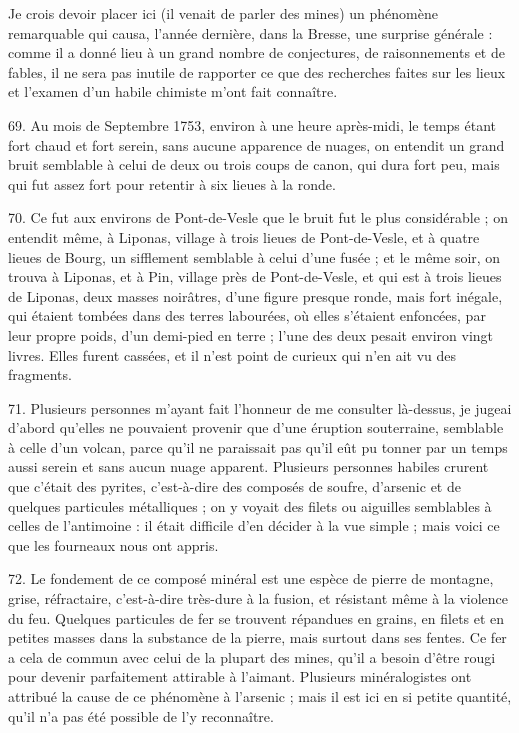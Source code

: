 \documentclass[a4paper, 11pt, oneside, polutonikogreek, french]{article}
\begin{document}
\og Je crois devoir placer ici (il venait de parler des mines) un phénomène remarquable qui causa, l'année dernière, dans la Bresse, une surprise générale : comme il a donné lieu à un grand nombre de conjectures, de raisonnements et de fables, il ne sera pas inutile de rapporter ce que des recherches faites sur les lieux et l'examen d'un habile chimiste m'ont fait connaître. \fg

69. Au mois de Septembre 1753, environ à une heure après-midi, le temps étant fort chaud et fort serein, sans aucune apparence de nuages, on entendit un grand bruit semblable à celui de deux ou trois coups de canon, qui dura fort peu, mais qui fut assez fort pour retentir à six lieues à la ronde.

70. Ce fut aux environs de Pont-de-Vesle que le bruit fut le plus considérable ; on entendit même, à Liponas, village à trois lieues de Pont-de-Vesle, et à quatre lieues de Bourg, un sifflement semblable à celui d'une fusée ; et le même soir, on trouva à Liponas, et à Pin, village près de Pont-de-Vesle, et qui est à trois lieues de Liponas, deux masses noirâtres, d'une figure presque ronde, mais fort inégale, qui étaient tombées dans des terres labourées, où elles s'étaient enfoncées, par leur propre poids, d'un demi-pied en terre ; l'une des deux pesait environ vingt livres. Elles furent cassées, et il n'est point de curieux qui n'en ait vu des fragments.

71. Plusieurs personnes m'ayant fait l'honneur de me consulter là-dessus, je jugeai d'abord qu'elles ne pouvaient provenir que d'une éruption souterraine, semblable à celle d'un volcan, parce qu'il ne paraissait pas qu'il eût pu tonner par un temps aussi serein et sans aucun nuage apparent. Plusieurs personnes habiles crurent que c'était des pyrites, c'est-à-dire des composés de soufre, d'arsenic et de quelques particules métalliques ; on y voyait des filets ou aiguilles semblables à celles de l'antimoine : il était difficile d'en décider à la vue simple ; mais voici ce que les fourneaux nous ont appris.

72. Le fondement de ce composé minéral est une espèce de pierre de montagne, grise, réfractaire, c'est-à-dire très-dure à la fusion, et résistant même à la violence du feu. Quelques particules de fer se trouvent répandues en grains, en filets et en petites masses dans la substance de la pierre, mais surtout dans ses fentes. Ce fer a cela de commun avec celui de la plupart des mines, qu'il a besoin d'être rougi pour devenir parfaitement attirable à l’aimant. Plusieurs minéralogistes ont attribué la cause de ce phénomène à l'arsenic ; mais il est ici en si petite quantité, qu'il n'a pas été possible de l'y reconnaître.
\end{document}
